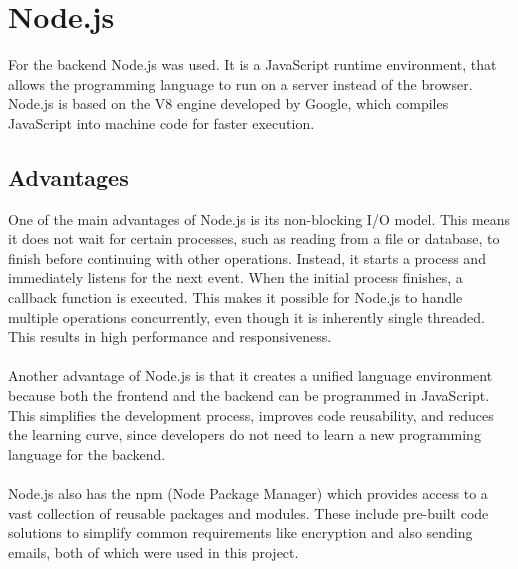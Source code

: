 \documentclass[a4paper,12pt]{report}
\begin{document}
\section{Node.js}
For the backend Node.js was used. It is a JavaScript runtime environment, that allows the programming language to run on a server instead of the browser. Node.js is based on the V8 engine developed by Google, which compiles JavaScript into machine code for faster execution. \parencite{nodejs-intro} \\

\subsection{Advantages}  
One of the main advantages of Node.js is its non-blocking I/O model. This means it does not wait for certain processes, such as reading from a file or database, to finish before continuing with other operations. Instead, it starts a process and immediately listens for the next event. When the initial process finishes, a callback function is executed. This makes it possible for Node.js to handle multiple operations concurrently, even though it is inherently single threaded. This results in high performance and responsiveness. \parencite{nodejs-nonblocking}\\\\
Another advantage of Node.js is that it creates a unified language environment because both the frontend and the backend can be programmed in JavaScript. This simplifies the development process, improves code reusability, and reduces the learning curve, since developers do not need to learn a new programming language for the backend.\\\\
Node.js also has the npm (Node Package Manager) which provides access to a vast collection of reusable packages and modules. These include pre-built code solutions to simplify common requirements like encryption and also sending emails, both of which were used in this project. \parencite{mdn-express-nodejs} \\ \\
\end{document}
